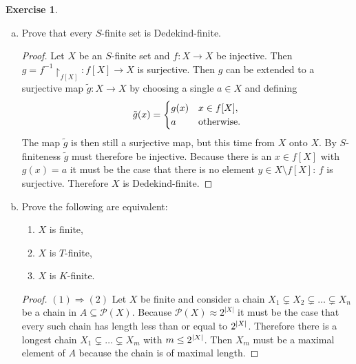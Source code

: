 \documentclass{article}
\theoremstyle{definition}
\newtheorem{question}{Exercise}
\newcommand{\powset}{\mathcal{P}}
\newcommand{\restrict}{\upharpoonright}
\DeclarePairedDelimiter{\abs}{|}{|}
\begin{document}
\begin{question}
\begin{enumerate}[a.]
        \item Prove that every \(S\)-finite set is Dedekind-finite.

              \begin{proof}
                  Let \(X\) be an \(S\)-finite set and \(f:X\to X\) be
                  injective. Then \(g=f^{-1}\restrict_{f[X]}:f[X]\to X\) is
                  surjective. Then \(g\) can be extended to a surjective map
                  \(\tilde{g}:X\to X\) by choosing a single \(a\in X\) and
                  defining
                  \[
                      \tilde{g}(x)=\begin{cases}
                          g(x) & x\in f[X],              \\
                          a    & \textnormal{otherwise}.
                      \end{cases}
                  \]
                  The map \(\tilde{g}\) is then still a surjective map, but this
                  time from \(X\) onto \(X\). By \(S\)-finiteness \(\tilde{g}\)
                  must therefore be injective. Because there is an \(x\in f[X]\)
                  with \(g(x)=a\) it must be the case that there is no element
                  \(y\in X\setminus f[X]\): \(f\) is surjective. Therefore
                  \(X\) is Dedekind-finite.
              \end{proof}

        \item Prove the following are equivalent:

              \begin{enumerate}[(1)]
                  \item \(X\) is finite,
                  \item \(X\) is \(T\)-finite,
                  \item \(X\) is \(K\)-finite.
              \end{enumerate}

              \begin{proof}
                  \((1)\Rightarrow(2)\) Let \(X\) be finite and consider a chain \(X_{1}\subsetneq
                  X_{2}\subsetneq\ldots\subsetneq X_{n}\) be a chain in
                  \(A\subseteq\powset(X)\). Because \(\powset(X)\approx
                  2^{|X|}\) it must be the case that every such chain has length
                  less than or equal to \(2^{\abs{X}}\). Therefore there is a
                  longest chain \(X_{1}\subsetneq\ldots\subsetneq X_{m}\) with
                  \(m\leq 2^{\abs{X}}\). Then \(X_{m}\) must be a maximal
                  element of \(A\) because the chain is of maximal length.


\end{proof}
\end{enumerate}
\end{question}
\end{document}
